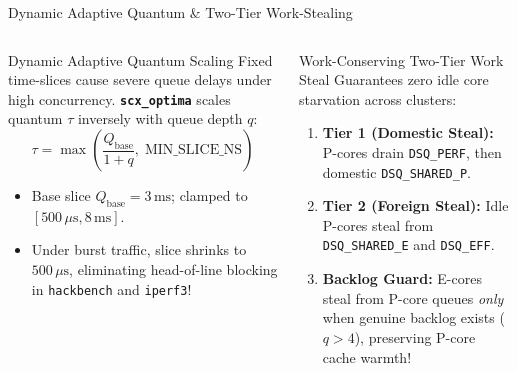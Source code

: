 \documentclass{beamer}
\begin{document}
\begin{frame}{Dynamic Adaptive Quantum \& Two-Tier Work-Stealing}
  \begin{columns}[T]
      \begin{block}{\small Dynamic Adaptive Quantum Scaling}
        \footnotesize
        Fixed time-slices cause severe queue delays under high concurrency. \textbf{\texttt{scx\_optima}} scales quantum $\tau$ inversely with queue depth $q$:
        $$\tau = \max\left(\frac{Q_{\text{base}}}{1 + q}, \; \text{MIN\_SLICE\_NS}\right)$$
        \begin{itemize}\itemsep2pt\tiny
          \item Base slice $Q_{\text{base}} = 3\,\text{ms}$; clamped to $[500\,\mu\text{s}, 8\,\text{ms}]$.
          \item Under burst traffic, slice shrinks to $500\,\mu\text{s}$, eliminating head-of-line blocking in \texttt{hackbench} and \texttt{iperf3}!
        \end{itemize}
      \end{block}

      \begin{exampleblock}{\small Work-Conserving Two-Tier Work Steal}
        \footnotesize
        Guarantees zero idle core starvation across clusters:
        \begin{enumerate}\itemsep2pt\tiny
          \item \textbf{Tier 1 (Domestic Steal):} P-cores drain \texttt{DSQ\_PERF}, then domestic \texttt{DSQ\_SHARED\_P}.
          \item \textbf{Tier 2 (Foreign Steal):} Idle P-cores steal from \texttt{DSQ\_SHARED\_E} and \texttt{DSQ\_EFF}.
          \item \textbf{Backlog Guard:} E-cores steal from P-core queues \textit{only} when genuine backlog exists ($q > 4$), preserving P-core cache warmth!
        \end{enumerate}
      \end{exampleblock}
  \end{columns}
\end{frame}
\end{document}
